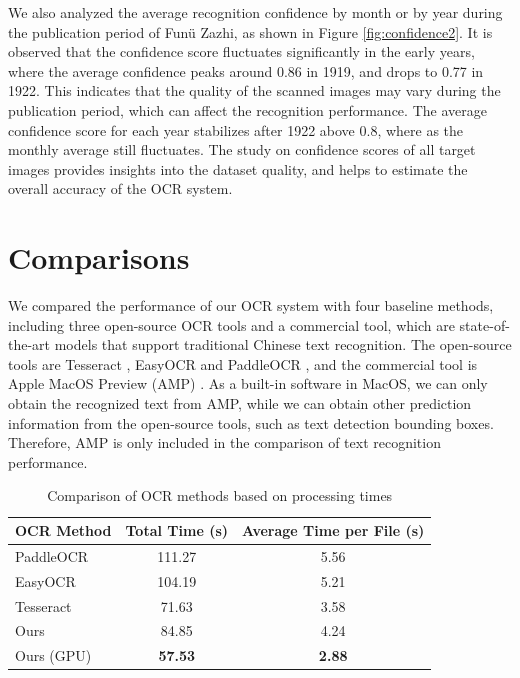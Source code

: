 \documentclass[12pt,twoside]{report}
\begin{document}
We also analyzed the average recognition confidence by month or by year during the publication period of Funü Zazhi, as shown in Figure \ref{fig:confidence2}. It is observed that the confidence score fluctuates significantly in the early years, where the average confidence peaks around 0.86 in 1919, and drops to 0.77 in 1922. This indicates that the quality of the scanned images may vary during the publication period, which can affect the recognition performance. The average confidence score for each year stabilizes after 1922 above 0.8, where as the monthly average still fluctuates. The study on confidence scores of all target images provides insights into the dataset quality, and helps to estimate the overall accuracy of the OCR system.

\section{Comparisons}
\label{sec:comparisons}
We compared the performance of our OCR system with four baseline methods, including three open-source OCR tools and a commercial tool, which are state-of-the-art models that support traditional Chinese text recognition. The open-source tools are Tesseract \cite{luscombe2020tesseract}, EasyOCR \cite{easyocr} and PaddleOCR \cite{paddle}, and the commercial tool is Apple MacOS Preview (AMP) \cite{preview}. As a built-in software in MacOS, we can only obtain the recognized text from AMP, while we can obtain other prediction information from the open-source tools, such as text detection bounding boxes. Therefore, AMP is only included in the comparison of text recognition performance.

\begin{table}[htbp]
    \centering
    \begin{tabular}{lcc}
    \toprule
    OCR Method & Total Time (s) & Average Time per File (s) \\
    \midrule
    PaddleOCR & 111.27 & 5.56 \\
    EasyOCR & 104.19 & 5.21 \\
    Tesseract & 71.63 & 3.58 \\
    Ours & 84.85 & 4.24 \\
    Ours (GPU) & \textbf{57.53} & \textbf{2.88} \\
    \bottomrule
    \end{tabular}
    \caption{Comparison of OCR methods based on processing times}
    \label{table:ocr_times}
\end{table}
\end{document}
